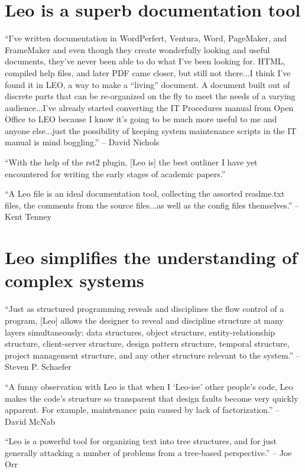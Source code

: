 \documentclass[a4paper,10pt,english]{sphinxmanual}
\begin{document}
\section{Leo is a superb documentation tool}
\label{testimonials:leo-is-a-superb-documentation-tool}
``I've written documentation in WordPerfert, Ventura, Word, PageMaker, and
FrameMaker and even though they create wonderfully looking and useful documents,
they've never been able to do what I've been looking for. HTML, compiled help
files, and later PDF came closer, but still not there...I think I've found it in
LEO, a way to make a ``living'' document. A document built out of discrete parts
that can be re-organized on the fly to meet the needs of a varying
audience...I've already started converting the IT Procedures manual from Open
Office to LEO because I know it's going to be much more useful to me and anyone
else...just the possibility of keeping system maintenance scripts in the IT
manual is mind boggling.'' -- David Nichols

``With the help of the rst2 plugin, {[}Leo is{]} the best outliner I have yet
encountered for writing the early stages of academic papers.''

``A Leo file is an ideal documentation tool, collecting the assorted readme.txt
files, the comments from the source files...as well as the config files
themselves.'' -- Kent Tenney


\section{Leo simplifies the understanding of complex systems}
\label{testimonials:leo-simplifies-the-understanding-of-complex-systems}
``Just as structured programming reveals and disciplines the flow control of a
program, {[}Leo{]} allows the designer to reveal and discipline structure at many
layers simultaneously: data structures, object structure, entity-relationship
structure, client-server structure, design pattern structure, temporal
structure, project management structure, and any other structure relevant to the
system.'' -- Steven P. Schaefer

``A funny observation with Leo is that when I `Leo-ise' other people's code, Leo
makes the code's structure so transparent that design faults become very quickly
apparent. For example, maintenance pain caused by lack of factorization.'' --
David McNab

``Leo is a powerful tool for organizing text into tree structures, and for just
generally attacking a number of problems from a tree-based perspective.'' -- Joe
Orr
\end{document}
